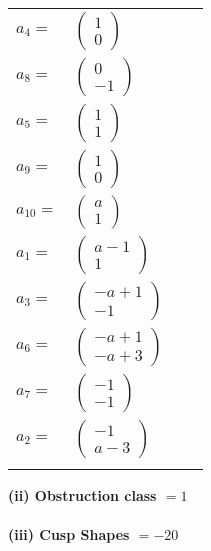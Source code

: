 \documentclass[1p]{elsarticle_modified}
\theoremstyle{definition}
\begin{document}
\begin{tabular}{m{7pt} m{180pt} m{7pt} m{180pt} }
\flushright $a_{4}=$&$\begin{pmatrix}1\\0\end{pmatrix}$ \\
\flushright $a_{8}=$&$\begin{pmatrix}0\\-1\end{pmatrix}$ \\
\flushright $a_{5}=$&$\begin{pmatrix}1\\1\end{pmatrix}$ \\
\flushright $a_{9}=$&$\begin{pmatrix}1\\0\end{pmatrix}$ \\
\flushright $a_{10}=$&$\begin{pmatrix}a\\1\end{pmatrix}$ \\
\flushright $a_{1}=$&$\begin{pmatrix}a-1\\1\end{pmatrix}$ \\
\flushright $a_{3}=$&$\begin{pmatrix}- a+1\\-1\end{pmatrix}$ \\
\flushright $a_{6}=$&$\begin{pmatrix}- a+1\\- a+3\end{pmatrix}$ \\
\flushright $a_{7}=$&$\begin{pmatrix}-1\\-1\end{pmatrix}$ \\
\flushright $a_{2}=$&$\begin{pmatrix}-1\\a-3\end{pmatrix}$\\&\end{tabular}
\flushleft \textbf{(ii) Obstruction class $= 1$}\\~\\
\flushleft \textbf{(iii) Cusp Shapes $= -20$}\\~\\
\end{document}
